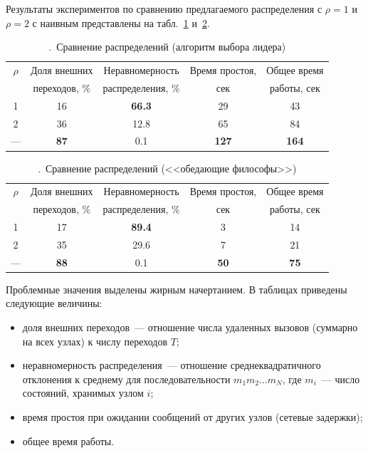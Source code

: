 \documentclass[12pt,a4paper,article]{bpm2}
\begin{document}
Результаты экспериментов по сравнению предлагаемого распределения с $\rho = 1$ и $\rho = 2$ с наивным представлены на табл.~\ref{tab:election-results} и~\ref{tab:philo-results}.

\begin{table}[htb]
  \centering
  \begin{tabular}{|c|c|c|c|c|}
    \hline
    $\rho$ & Доля внешних        & Неравномерность   & Время простоя, & Общее время \\
           & переходов, \%       & распределения, \% & сек            & работы, сек                 \\ \hline
    1      & 16                  & \textbf{66.3}     & 29             & 43                  \\ \hline
    2      & 36                  & 12.8              & 65             & 84                  \\ \hline
    ---    & \textbf{87}         & 0.1               & \textbf{127}   & \textbf{164}        \\ \hline
  \end{tabular}
  \caption{.~Сравнение распределений (алгоритм выбора лидера)}
  \label{tab:election-results}
\end{table}

\begin{table}[htb]
  \centering
  \begin{tabular}{|c|c|c|c|c|}
    \hline
    $\rho$ & Доля внешних        & Неравномерность   & Время простоя, & Общее время \\
           & переходов, \%       & распределения, \% & сек            & работы, сек         \\ \hline
    1      & 17                  & \textbf{89.4}     & 3              & 14                  \\ \hline
    2      & 35                  & 29.6              & 7              & 21                  \\ \hline
    ---    & \textbf{88}         & 0.1               & \textbf{50}    & \textbf{75}         \\ \hline
  \end{tabular}
  \caption{.~Сравнение распределений (<<обедающие философы>>)}
  \label{tab:philo-results}
\end{table}


Проблемные значения выделены жирным начертанием. В таблицах приведены следующие величины:

\begin{itemize}
\item доля внешних переходов~--- отношение числа удаленных вызовов (суммарно на всех узлах) к числу переходов $T$;
\item неравномерность распределения~--- отношение среднеквадратичного отклонения к среднему для последовательности $m_1
  m_2 \ldots m_N$, где $m_i$~--- число состояний, хранимых узлом $i$;
\item время простоя при ожидании сообщений от других узлов (сетевые задержки);
\item общее время работы.
\end{itemize}
\end{document}
